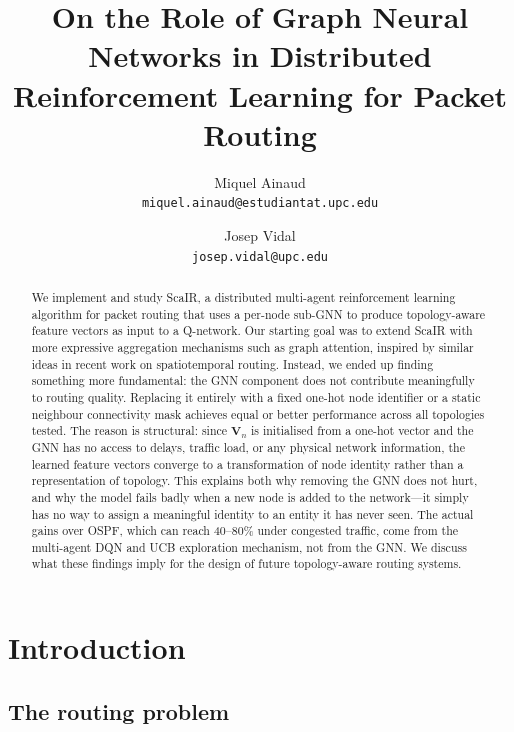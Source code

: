 \documentclass[10pt,twocolumn,letterpaper]{article}
\begin{document}
\title{On the Role of Graph Neural Networks in Distributed\\
Reinforcement Learning for Packet Routing}

\author{Miquel Ainaud\\
{\tt\small miquel.ainaud@estudiantat.upc.edu}
\and
Josep Vidal\\
{\tt\small josep.vidal@upc.edu}
}

\maketitle

\begin{abstract}
We implement and study ScaIR, a distributed multi-agent reinforcement
learning algorithm for packet routing that uses a per-node sub-GNN to
produce topology-aware feature vectors as input to a Q-network. Our
starting goal was to extend ScaIR with more expressive aggregation
mechanisms such as graph attention, inspired by similar ideas in recent
work on spatiotemporal routing. Instead, we ended up finding something
more fundamental: the GNN component does not contribute meaningfully to
routing quality. Replacing it entirely with a fixed one-hot node identifier
or a static neighbour connectivity mask achieves equal or better
performance across all topologies tested. The reason is structural: since
$\mathbf{V}_n$ is initialised from a one-hot vector and the GNN has no
access to delays, traffic load, or any physical network information, the
learned feature vectors converge to a transformation of node identity
rather than a representation of topology. This explains both why removing
the GNN does not hurt, and why the model fails badly when a new node is
added to the network---it simply has no way to assign a meaningful
identity to an entity it has never seen. The actual gains over OSPF,
which can reach 40--80\% under congested traffic, come from the
multi-agent DQN and UCB exploration mechanism, not from the GNN. We
discuss what these findings imply for the design of future
topology-aware routing systems.
\end{abstract}

\section{Introduction}

\subsection{The routing problem}
\end{document}
